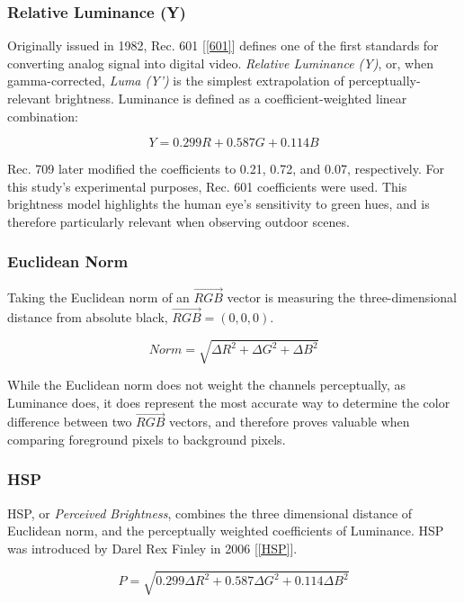 \subsubsection{Relative Luminance (Y)}

Originally issued in 1982, Rec. 601 [\ref{601}] defines 	one of the first standards for converting analog signal into digital video. \textit{Relative Luminance (Y)}, or, when gamma-corrected, \textit{Luma (Y')} is the simplest extrapolation of perceptually-relevant brightness. Luminance is defined as a coefficient-weighted linear combination:

\begin{equation}
Y = 0.299R + 0.587G + 0.114B
\end{equation}

Rec. 709 later modified the coefficients to 0.21, 0.72, and 0.07, respectively. For this study's experimental purposes, Rec. 601 coefficients were used. This brightness model highlights the human eye's sensitivity to green hues, and is therefore particularly relevant when observing outdoor scenes. 

\subsubsection{Euclidean Norm}

Taking the Euclidean norm of an $\vec{RGB}$ vector is measuring the three-dimensional distance from absolute black, $\vec{RGB} = (0,0,0)$. 

\begin{equation}
Norm = \sqrt{\Delta R^2 + \Delta G^2 + \Delta B^2}
\end{equation}

While the Euclidean norm does not weight the channels perceptually, as Luminance does, it does represent the most accurate way to determine the color difference between two $\vec{RGB}$ vectors, and therefore proves valuable when comparing foreground pixels to background pixels. 

\subsubsection{HSP}

HSP, or \textit{Perceived Brightness}, combines the three dimensional distance of Euclidean norm, and the perceptually weighted coefficients of Luminance. HSP was introduced by Darel Rex Finley in 2006 [\ref{HSP}].

\begin{equation}
P = \sqrt{0.299\Delta R^2 + 0.587\Delta G^2 + 0.114\Delta B^2}
\end{equation}

